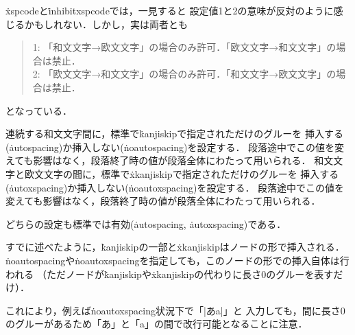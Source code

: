 \documentclass[a4paper,11pt,nomag,dvipdfmx]{jsarticle}
\begin{document}
\begin{dangerous}
  \.{xspcode}と\.{inhibitxspcode}では，一見すると
  設定値1と2の意味が反対のように感じるかもしれない．しかし，実は両者とも
  \begin{quote}
    1: 「和文文字→欧文文字」の場合のみ許可．「欧文文字→和文文字」の場合は禁止．\\
    2: 「欧文文字→和文文字」の場合のみ許可．「和文文字→欧文文字」の場合は禁止．
  \end{quote}
  となっている．
\end{dangerous}

\begin{cslist}
  連続する和文文字間に，標準で\.{kanjiskip}で指定されただけのグルーを
  挿入する(\.{autospacing})か挿入しない(\.{noautospacing})を設定する．
  段落途中でこの値を変えても影響はなく，段落終了時の値が段落全体にわたって用いられる．
  和文文字と欧文文字の間に，標準で\.{xkanjiskip}で指定されただけのグルーを
  挿入する(\.{autoxspacing})か挿入しない(\.{noautoxspacing})を設定する．
  段落途中でこの値を変えても影響はなく，段落終了時の値が段落全体にわたって用いられる．
\end{cslist}

どちらの設定も標準では有効(\.{autospacing}, \.{autoxspacing})である．
\begin{dangerous}
  すでに述べたように，\.{kanjiskip}の一部と\.{xkanjiskip}はノードの形で挿入される．
  \.{noautospacing}や\.{noautoxspacing}を指定しても，このノードの形での挿入自体は行われる
 （ただノードが\.{kanjiskip}や\.{xkanjiskip}の代わりに長さ0のグルーを表すだけ）．

  これにより，例えば\.{noautoxspacing}状況下で「|あa|」と
  入力しても，間に長さ0のグルーがあるため「あ」と「a」の間で改行可能となることに注意．
\end{dangerous}
\end{document}
